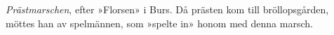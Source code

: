 \textit{Prästmarschen}, efter »Florsen» i Burs. Då prästen kom till bröllopsgården,
möttes han av spelmännen, som »spelte in» honom med denna marsch.